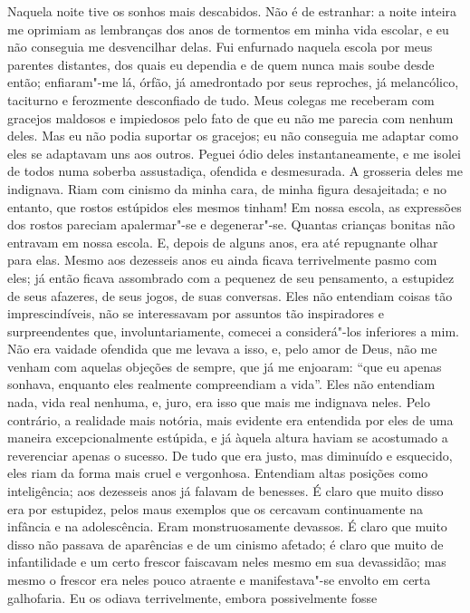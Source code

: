 Naquela noite tive os sonhos mais descabidos. Não é de estranhar: a
noite inteira me oprimiam as lembranças dos anos de tormentos em minha
vida escolar, e eu não conseguia me desvencilhar delas. Fui enfurnado
naquela escola por meus parentes distantes, dos quais eu dependia e de
quem nunca mais soube desde então; enfiaram"-me lá, órfão, já
amedrontado por seus reproches, já melancólico, taciturno e ferozmente
desconfiado de tudo. Meus colegas me receberam com gracejos maldosos e
impiedosos pelo fato de que eu não me parecia com nenhum deles. Mas eu
não podia suportar os gracejos; eu não conseguia me adaptar como eles
se adaptavam uns aos outros. Peguei ódio deles instantaneamente, e me
isolei de todos numa soberba assustadiça, ofendida e desmesurada. A
grosseria deles me indignava. Riam com cinismo da minha cara, de minha
figura desajeitada; e no entanto, que rostos estúpidos eles mesmos
tinham! Em nossa escola, as expressões dos rostos pareciam apalermar"-se
e degenerar"-se. Quantas crianças bonitas não entravam em nossa escola.
E, depois de alguns anos, era até repugnante olhar para elas. Mesmo aos
dezesseis anos eu ainda ficava terrivelmente pasmo com eles; já então
ficava assombrado com a pequenez de seu pensamento, a estupidez de seus
afazeres, de seus jogos, de suas conversas. Eles não entendiam coisas
tão imprescindíveis, não se interessavam por assuntos tão inspiradores
e surpreendentes que, involuntariamente, comecei a considerá"-los
inferiores a mim. Não era vaidade ofendida que me levava a isso, e,
pelo amor de Deus, não me venham com aquelas objeções de sempre, que já
me enjoaram: ``que eu apenas sonhava, enquanto eles realmente
compreendiam a vida''. Eles não entendiam nada, vida real nenhuma, e,
juro, era isso que mais me indignava neles. Pelo contrário, a realidade
mais notória, mais evidente era entendida por eles de uma maneira
excepcionalmente estúpida, e já àquela altura haviam se acostumado a
reverenciar apenas o sucesso. De tudo que era justo, mas diminuído e
esquecido, eles riam da forma mais cruel e vergonhosa. Entendiam altas
posições como inteligência; aos dezesseis anos já falavam de benesses.
É claro que muito disso era por estupidez, pelos maus exemplos que os
cercavam continuamente na infância e na adolescência. Eram
monstruosamente devassos. É claro que muito disso não passava de
aparências e de um cinismo afetado; é claro que muito de infantilidade
e um certo frescor faiscavam neles mesmo em sua devassidão; mas mesmo o
frescor era neles pouco atraente e manifestava"-se envolto em certa
galhofaria. Eu os odiava terrivelmente, embora possivelmente fosse
